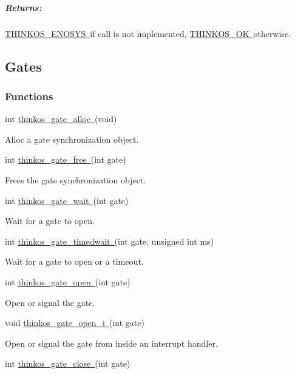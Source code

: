 {\subparagraph{\texorpdfstring{{Returns:}}{Returns:}}\label{returns-42}

{\protect\hyperlink{h.3s49zyc}{THINKOS\_ENOSYS}}{\protect\hyperlink{h.3s49zyc}{~}}{if
call is not implemented,
}{\protect\hyperlink{h.2fk6b3p}{THINKOS\_OK}}{\protect\hyperlink{h.2fk6b3p}{~}}{otherwise.
}

\paragraph{\texorpdfstring{{}}{}}\label{section-6}

\subsection{\texorpdfstring{{Gates}}{Gates}}\label{gates}

\subsubsection{\texorpdfstring{{Functions}}{Functions}}\label{h.2zbgiuw}

{int
}{\protect\hyperlink{h.1egqt2p}{thinkos\_gate\_alloc}}{\protect\hyperlink{h.1egqt2p}{~}}{(void)}

{Alloc a gate synchronization object. }

{int
}{\protect\hyperlink{h.3ygebqi}{thinkos\_gate\_free}}{\protect\hyperlink{h.3ygebqi}{~}}{(int
gate)}

{Frees the gate synchronization object. }

{int
}{\protect\hyperlink{h.2dlolyb}{thinkos\_gate\_wait}}{\protect\hyperlink{h.2dlolyb}{~}}{(int
gate)}

{Wait for a gate to open. }

{int
}{\protect\hyperlink{h.sqyw64}{thinkos\_gate\_timedwait}}{\protect\hyperlink{h.sqyw64}{~}}{(int
gate, unsigned int ms)}

{Wait for a gate to open or a timeout. }

{int
}{\protect\hyperlink{h.3cqmetx}{thinkos\_gate\_open}}{\protect\hyperlink{h.3cqmetx}{~}}{(int
gate)}

{Open or signal the gate. }

{void
}{\protect\hyperlink{h.1rvwp1q}{thinkos\_gate\_open\_i}}{\protect\hyperlink{h.1rvwp1q}{~}}{(int
gate)}

{Open or signal the gate from inside an interrupt handler. }

{int
}{\protect\hyperlink{h.4bvk7pj}{thinkos\_gate\_close}}{\protect\hyperlink{h.4bvk7pj}{~}}{(int
gate)}

}
